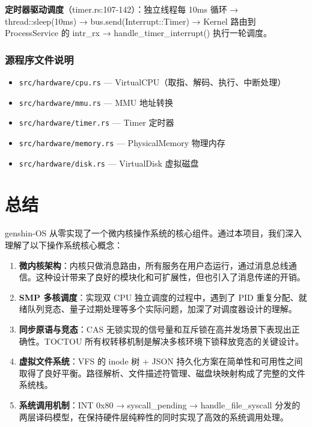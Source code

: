\documentclass[UTF8,a4paper,12pt]{ctexart}
\begin{document}
\textbf{定时器驱动调度}（timer.rs:107-142）：独立线程每 10ms 循环 → thread::sleep(10ms) → bus.send(Interrupt::Timer) → Kernel 路由到 ProcessService 的 intr\_rx → handle\_timer\_interrupt() 执行一轮调度。

\subsubsection{源程序文件说明}

\begin{itemize}
    \item \texttt{src/hardware/cpu.rs} — VirtualCPU（取指、解码、执行、中断处理）
    \item \texttt{src/hardware/mmu.rs} — MMU 地址转换
    \item \texttt{src/hardware/timer.rs} — Timer 定时器
    \item \texttt{src/hardware/memory.rs} — PhysicalMemory 物理内存
    \item \texttt{src/hardware/disk.rs} — VirtualDisk 虚拟磁盘
\end{itemize}

\newpage


\section{总结}

genshin-OS 从零实现了一个微内核操作系统的核心组件。通过本项目，我们深入理解了以下操作系统核心概念：

\begin{enumerate}[label=(\arabic*)]
    \item \textbf{微内核架构}：内核只做消息路由，所有服务在用户态运行，通过消息总线通信。这种设计带来了良好的模块化和可扩展性，但也引入了消息传递的开销。
    \item \textbf{SMP 多核调度}：实现双 CPU 独立调度的过程中，遇到了 PID 重复分配、就绪队列竞态、量子过期处理等多个实际问题，加深了对调度器设计的理解。
    \item \textbf{同步原语与竞态}：CAS 无锁实现的信号量和互斥锁在高并发场景下表现出正确性。TOCTOU 所有权转移机制是解决多核环境下锁释放竞态的关键设计。
    \item \textbf{虚拟文件系统}：VFS 的 inode 树 + JSON 持久化方案在简单性和可用性之间取得了良好平衡。路径解析、文件描述符管理、磁盘块映射构成了完整的文件系统栈。
    \item \textbf{系统调用机制}：INT 0x80 → syscall\_pending → handle\_file\_syscall 分发的两层译码模型，在保持硬件层纯粹性的同时实现了高效的系统调用处理。
\end{enumerate}
\end{document}
